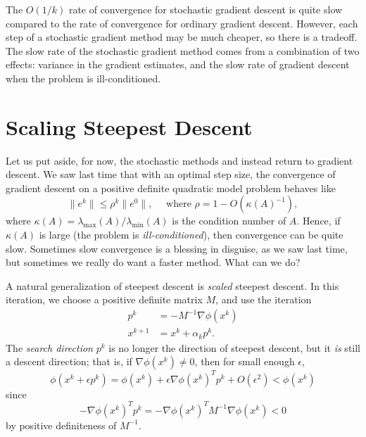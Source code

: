 \documentclass[12pt, leqno]{article} %
\begin{document}
The $O(1/k)$ rate of convergence for stochastic gradient descent is quite slow
compared to the rate of convergence for ordinary gradient descent.
However, each step of a stochastic gradient method may be much
cheaper, so there is a tradeoff.  The slow rate of the stochastic
gradient method comes from a combination of two effects: variance in
the gradient estimates, and the slow rate of gradient descent when the
problem is ill-conditioned.

\section{Scaling Steepest Descent}

Let us put aside, for now, the stochastic methods and instead
return to gradient descent.  We saw last time that with an optimal
step size, the convergence of gradient descent on a positive definite
quadratic model problem behaves like
\[
  \|e^k\| \leq \rho^k \|e^0\|, \quad \mbox{ where }
  \rho = 1 - O(\kappa(A)^{-1}),
\]
where $\kappa(A) = \lambda_{\max}(A)/\lambda_{\min}(A)$ is the
condition number of $A$.  Hence, if $\kappa(A)$ is large (the problem
is {\em ill-conditioned}), then convergence can be quite slow.
Sometimes slow convergence is a blessing in disguise, as we saw last
time, but sometimes we really do want a faster method.  What can we
do?

A natural generalization of steepest descent is {\em scaled} steepest
descent.  In this iteration, we choose a positive definite matrix $M$,
and use the iteration
\begin{align*}
  p^{k}   &= -M^{-1} \nabla \phi(x^k) \\
  x^{k+1} &= x^k + \alpha_k p^k.
\end{align*}
The {\em search direction} $p^k$ is no longer the direction of steepest
descent, but it {\em is} still a descent direction; that is, if
$\nabla \phi(x^k) \neq 0$, then for small enough $\epsilon$,
\[
  \phi(x^k + \epsilon p^k) =
  \phi(x^k) + \epsilon \nabla \phi(x^k)^T p^k + O(\epsilon^2) < \phi(x^k)
\]
since
\[
  -\nabla \phi(x^k)^T p^k = -\nabla \phi(x^k)^T M^{-1} \nabla
  \phi(x^k) < 0
\]
by positive definiteness of $M^{-1}$.
\end{document}
